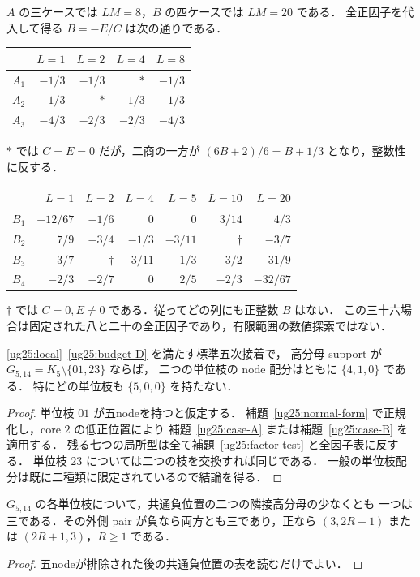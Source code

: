 $A$ の三ケースでは $LM=8$，$B$ の四ケースでは $LM=20$ である．
全正因子を代入して得る $B=-E/C$ は次の通りである．
\begin{center}\small
\begin{tabular}{c|rrrr}
&$L=1$&$L=2$&$L=4$&$L=8$\\\hline
$A_1$&$-1/3$&$-1/3$&$\ast$&$-1/3$\\
$A_2$&$-1/3$&$\ast$&$-1/3$&$-1/3$\\
$A_3$&$-4/3$&$-2/3$&$-2/3$&$-4/3$
\end{tabular}
\end{center}
$\ast$ では $C=E=0$ だが，二商の一方が
$(6B+2)/6=B+1/3$ となり，整数性に反する．
\begin{center}\small
\begin{tabular}{c|rrrrrr}
&$L=1$&$L=2$&$L=4$&$L=5$&$L=10$&$L=20$\\\hline
$B_1$&$-12/67$&$-1/6$&0&0&$3/14$&$4/3$\\
$B_2$&$7/9$&$-3/4$&$-1/3$&$-3/11$&$\dagger$&$-3/7$\\
$B_3$&$-3/7$&$\dagger$&$3/11$&$1/3$&$3/2$&$-31/9$\\
$B_4$&$-2/3$&$-2/7$&0&$2/5$&$-2/3$&$-32/67$
\end{tabular}
\end{center}
$\dagger$ では $C=0,E\ne0$ である．従ってどの列にも正整数 $B$ はない．
この三十六場合は固定された八と二十の全正因子であり，有限範囲の数値探索ではない．

\begin{theorem}[$G_{5,14}$ の五node排除]\label{ug25:no-five}
\eqref{ug25:local}--\eqref{ug25:budget-D} を満たす標準五次接着で，
高分母 support が $G_{5,14}=K_5\setminus\{01,23\}$ ならば，
二つの単位枝の node 配分はともに $\{4,1,0\}$ である．
特にどの単位枝も $\{5,0,0\}$ を持たない．
\end{theorem}

\begin{proof}
単位枝 $01$ が五nodeを持つと仮定する．
補題~\ref{ug25:normal-form} で正規化し，core $2$ の低正位置により
補題~\ref{ug25:case-A} または補題~\ref{ug25:case-B} を適用する．
残る七つの局所型は全て補題~\ref{ug25:factor-test} と全因子表に反する．
単位枝 $23$ については二つの枝を交換すれば同じである．
一般の単位枝配分は既に二種類に限定されているので結論を得る．
\end{proof}

\begin{corollary}[残る配置の小分母]\label{ug25:small-three}
$G_{5,14}$ の各単位枝について，共通負位置の二つの隣接高分母の少なくとも
一つは三である．その外側 pair が負なら両方とも三であり，正なら
$(3,2R+1)$ または $(2R+1,3)$，$R\ge1$ である．
\end{corollary}
\begin{proof}
五nodeが排除された後の共通負位置の表を読むだけでよい．
\end{proof}

